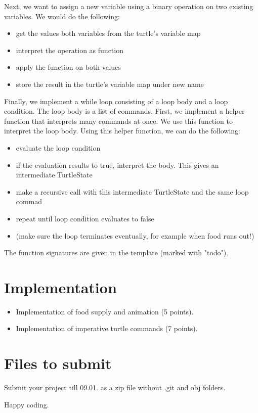 \documentclass[a4paper]{article}
\begin{document}
\noindent Next, we want to assign a new variable using a binary operation on two existing variables. We would do the following:
\begin{itemize}
\item get the values both variables from the turtle's variable map
\item interpret the operation as function
\item apply the function on both values
\item store the result in the turtle's variable map under new name
\end{itemize}

\bigskip

\noindent Finally, we implement a while loop consisting of a loop body and a loop condition. The loop body is a list of commands. First, we implement a helper function that interprets many commands at once. We use this function to interpret the loop body. Using this helper function, we can do the following:
\begin{itemize}
\item evaluate the loop condition
\item if the evaluation results to true, interpret the body. This gives an intermediate TurtleState
\item make a recursive call with this intermediate TurtleState and the same loop commad
\item repeat until loop condition evaluates to false 
\item (make sure the loop terminates eventually, for example when food runs out!)
\end{itemize}

The function signatures are given in the template (marked with "todo").

\bigskip

\section{Implementation}

\begin{itemize}
\item Implementation of food supply and animation (5 points).
\item Implementation of imperative turtle commands (7 points).
\end{itemize}

\section{Files to submit}

Submit your project till 09.01. as a zip file without .git and obj folders.

\bigskip

Happy coding.

%


%
\end{document}

